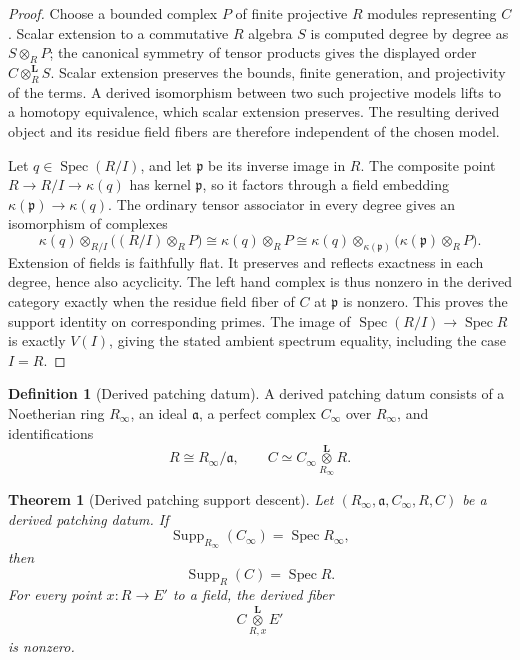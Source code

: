 \documentclass[11pt]{amsart}
\newtheorem{theorem}{Theorem}[section]
\theoremstyle{definition}
\newtheorem{definition}[definition]{Definition}
\theoremstyle{remark}
\newcommand{\Spec}{\operatorname{Spec}}
\newcommand{\Supp}{\operatorname{Supp}}
\newcommand{\frakp}{\mathfrak p}
\newcommand{\fraka}{\mathfrak a}
\begin{document}
\begin{proof}
Choose a bounded complex \(P\) of finite projective \(R\) modules representing \(C\). Scalar extension to a commutative \(R\) algebra \(S\) is computed degree by degree as \(S\otimes_RP\); the canonical symmetry of tensor products gives the displayed order \(C\otimes_R^{\mathbf L}S\). Scalar extension preserves the bounds, finite generation, and projectivity of the terms. A derived isomorphism between two such projective models lifts to a homotopy equivalence, which scalar extension preserves. The resulting derived object and its residue field fibers are therefore independent of the chosen model.

Let \(q\in\Spec(R/I)\), and let \(\frakp\) be its inverse image in \(R\). The composite point \(R\to R/I\to\kappa(q)\) has kernel \(\frakp\), so it factors through a field embedding \(\kappa(\frakp)\to\kappa(q)\). The ordinary tensor associator in every degree gives an isomorphism of complexes
\[
\kappa(q)\otimes_{R/I}\bigl((R/I)\otimes_RP\bigr)
\cong\kappa(q)\otimes_RP
\cong\kappa(q)\otimes_{\kappa(\frakp)}
\bigl(\kappa(\frakp)\otimes_RP\bigr).
\]
Extension of fields is faithfully flat. It preserves and reflects exactness in each degree, hence also acyclicity. The left hand complex is thus nonzero in the derived category exactly when the residue field fiber of \(C\) at \(\frakp\) is nonzero. This proves the support identity on corresponding primes. The image of \(\Spec(R/I)\to\Spec R\) is exactly \(V(I)\), giving the stated ambient spectrum equality, including the case \(I=R\).
\end{proof}

\begin{definition}[Derived patching datum]\label{def:derived_patching_datum}
A derived patching datum consists of a Noetherian ring \(R_\infty\), an ideal
\(\fraka\), a perfect complex \(C_\infty\) over \(R_\infty\), and identifications
\[
R\cong R_\infty/\fraka,
\qquad
C\simeq
C_\infty
\mathbin{\mathop{\otimes}\limits_{R_\infty}^{\mathbf L}}R.
\]
\end{definition}

\begin{theorem}[Derived patching support descent]\label{thm:derived_support_descent}
Let \((R_\infty,\fraka,C_\infty,R,C)\) be a derived patching datum. If
\[
\Supp_{R_\infty}(C_\infty)=\Spec R_\infty,
\]
then
\[
\boxed{
\Supp_R(C)=\Spec R.
}
\]
For every point \(x:R\to E'\) to a field, the derived fiber
\[
C\mathbin{\mathop{\otimes}\limits_{R,x}^{\mathbf L}}E'
\]
is nonzero.
\end{theorem}
\end{document}
